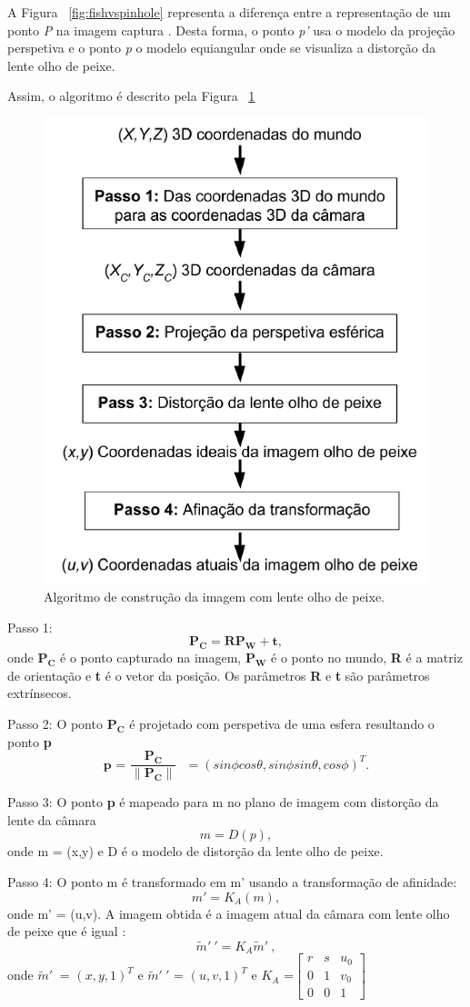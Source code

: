 A Figura ~\ref{fig:fishvspinhole} representa a diferença entre a representação de um ponto \textit{P} na imagem captura . Desta forma, o ponto \textit{p'} usa o modelo da projeção perspetiva e o ponto \textit{p} o modelo equiangular onde se visualiza a distorção da lente olho de peixe.

Assim, o algoritmo é descrito pela Figura ~\ref{fig:fisheyealgortim}

\begin{figure}[h!]
	\centering
	\includegraphics[width=0.4\linewidth]{figures/fisheyealgortimpt}
	\caption{Algoritmo de construção da imagem com lente olho de peixe. \cite{Ying2006}}
	\label{fig:fisheyealgortim}
\end{figure}

Passo 1:  \[ \textbf{P}_\textbf{C} = \textbf{R}\textbf{P}_\textbf{W} + \textbf{t} , \] onde $\textbf{P}_\textbf{C}$ é o ponto capturado na imagem, $\textbf{P}_\textbf{W}$ é o ponto no mundo, \textbf{R} é a matriz de orientação e \textbf{t} é o vetor da posição. Os parâmetros \textbf{R} e \textbf{t} são parâmetros extrínsecos. 

Passo 2: O ponto $\textbf{P}_\textbf{C}$ é projetado com perspetiva de uma esfera resultando o ponto \textbf{p} \[ \textbf{p = $\frac{\textbf{P}_\textbf{C}}{ \| \textbf{P}_\textbf{C} \| }$ } = ( sin \phi cos \theta, sin \phi sin \theta, cos \phi)^T  . \]

Passo 3: O ponto \textbf{p} é mapeado para m no plano de imagem com distorção da lente da câmara \[ m = D(p) , \] onde m = (x,y) e D é o modelo de distorção da lente olho de peixe. 

Passo 4: O ponto m é transformado em m' usando a transformação de afinidade: \[ m' = K_A(m) , \] onde m' = (u,v). A imagem obtida é a imagem atual da câmara com lente olho de peixe que é igual : \[ \widetilde{m}'\ ' = K_A \widetilde{m}'\  ,\] onde $\widetilde{m}'\ $ = $(x,y,1)^T$ e $\widetilde{m}'\ '$ = $(u,v,1)^T$ e $K_A$ =$\left[ \begin{array}{ccc}
r & s & u_0 \\ 
0 & 1 & v_0 \\ 
0 & 0 & 1
\end{array} \right]$ 


